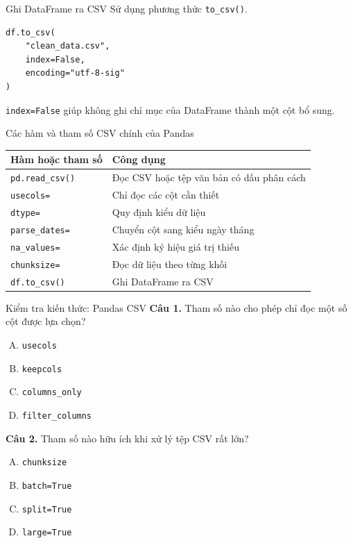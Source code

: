 \documentclass[aspectratio=169,11pt]{beamer}
\newcommand{\code}[1]{\texttt{#1}}
\newcommand{\smallgap}{\vspace{0.4em}}
\begin{document}
\begin{frame}[fragile]{Ghi DataFrame ra CSV}
Sử dụng phương thức \code{to\_csv()}.

\begin{lstlisting}[style=pythonstyle]
df.to_csv(
    "clean_data.csv",
    index=False,
    encoding="utf-8-sig"
)
\end{lstlisting}

\code{index=False} giúp không ghi chỉ mục của DataFrame thành một cột bổ sung.
\end{frame}

\begin{frame}{Các hàm và tham số CSV chính của Pandas}
\begin{tabularx}{\textwidth}{lX}
\toprule
\textbf{Hàm hoặc tham số} & \textbf{Công dụng} \\
\midrule
\code{pd.read\_csv()} & Đọc CSV hoặc tệp văn bản có dấu phân cách \\
\code{usecols=} & Chỉ đọc các cột cần thiết \\
\code{dtype=} & Quy định kiểu dữ liệu \\
\code{parse\_dates=} & Chuyển cột sang kiểu ngày tháng \\
\code{na\_values=} & Xác định ký hiệu giá trị thiếu \\
\code{chunksize=} & Đọc dữ liệu theo từng khối \\
\code{df.to\_csv()} & Ghi DataFrame ra CSV \\
\bottomrule
\end{tabularx}
\end{frame}

\begin{frame}{Kiểm tra kiến thức: Pandas CSV}
\textbf{Câu 1.} Tham số nào cho phép chỉ đọc một số cột được lựa chọn?
\begin{enumerate}[A.]
  \item \code{usecols}
  \item \code{keepcols}
  \item \code{columns\_only}
  \item \code{filter\_columns}
\end{enumerate}

\smallgap
\textbf{Câu 2.} Tham số nào hữu ích khi xử lý tệp CSV rất lớn?
\begin{enumerate}[A.]
  \item \code{chunksize}
  \item \code{batch=True}
  \item \code{split=True}
  \item \code{large=True}
\end{enumerate}
\end{frame}
\end{document}
